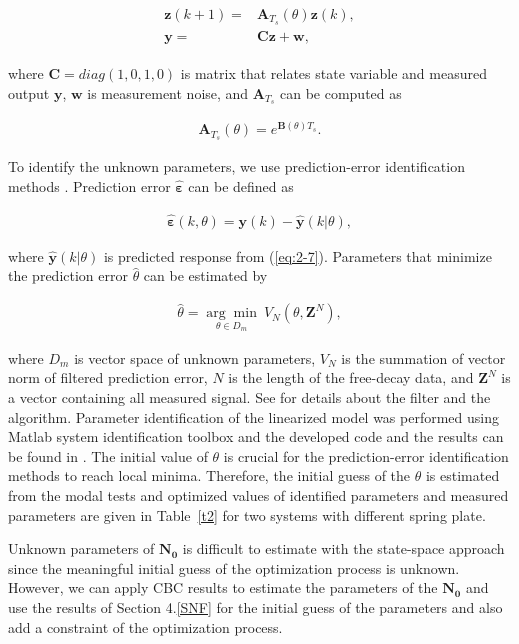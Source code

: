 \documentclass[openacc]{rsproca_new}%
\theoremstyle{own}
\def\epsilon{\varepsilon}
\def\vec#1{\ensuremath{\mathbf{#1}}}
\newcommand{\Eref}[1]{(\ref{#1})}
\newcommand{\Tref}[1]{Table~\ref{#1}}
\begin{document}
\begin{align}\label{eq:2-7}
  \begin{split}
\vec{z}(k+1)=&\vec{A}_{T_s}(\theta)\vec{z}(k),\\
\vec{y}=&\vec{C}\vec{z}+\vec{w},
\end{split}
\end{align}

\noindent where $\vec{C}=diag(1,0,1,0)$ is matrix that relates state variable and measured output $\vec{y}$, $\vec{w}$ is measurement noise, and $\vec{A}_{T_s}$ can be computed as

\begin{align}\label{eq:2-8}
\vec{A}_{T_s}(\theta)=e^{\vec{B}(\theta)T_s}.
\end{align}


\noindent To identify the unknown parameters, we use prediction-error identification methods \cite{ljung2001system}. Prediction error \vec{\hat \epsilon} can be defined as

\begin{align}\label{eq:2-9}
\vec{\hat \epsilon}(k,\theta)=\vec{y}(k)-\hat{\vec{y}}(k|\theta),
\end{align}

\noindent where $\hat{\vec{y}}(k|\theta)$ is predicted response from \Eref{eq:2-7}. Parameters that minimize the prediction error $\hat \theta$ can be estimated by

\begin{align}\label{eq:2-10}
\hat{\theta}=\underset{\theta \in D_m}{\arg\min} \: V_N(\theta,\vec{Z}^N),
\end{align}

\noindent where $D_m$ is vector space of unknown parameters, $V_N$ is the summation of vector norm of filtered prediction error, $N$ is the length of the free-decay data, and $\vec{Z}^N$ is a vector containing all measured signal. See \cite{ljung2001system} for details about the filter and the algorithm. Parameter identification of the linearized model was performed using Matlab system identification toolbox \cite{ljung1988system} and the developed code and the results can be found in \cite{sysID}. The initial value of $\theta$ is crucial for the prediction-error identification methods to reach local minima. Therefore, the initial guess of the $\theta$ is estimated from the modal tests and optimized values of identified parameters and measured parameters are given in \Tref{t2} for two systems with different spring plate.

Unknown parameters of $\vec{N_0}$ is difficult to estimate with the state-space approach since the meaningful initial guess of the optimization process is unknown. However, we can apply CBC results to estimate the parameters of the $\vec{N_0}$ and use the results of
Section 4.\ref{SNF} for the initial guess of the parameters and also add a constraint of the optimization process.
\end{document}
